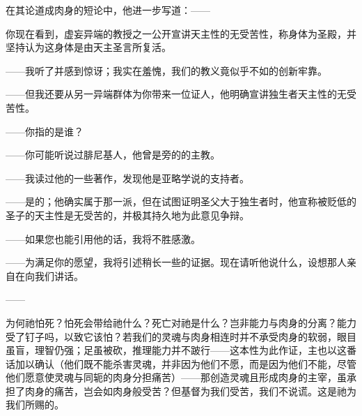 在其论道成肉身的短论中，他进一步写道：——\par

\par

你现在看到，虚妄异端的教授之一公开宣讲天主性的无受苦性，称身体为圣殿，并坚持认为这身体是由天主圣言所复活。\par

——我听了并感到惊讶；我实在羞愧，我们的教义竟似乎不如的创新牢靠。\par

——但我还要从另一异端群体为你带来一位证人，他明确宣讲独生者天主性的无受苦性。\par

——你指的是谁？\par

——你可能听说过腓尼基人，他曾是旁的的主教。\par

——我读过他的一些著作，发现他是亚略学说的支持者。\par

——是的；他确实属于那一派，但在试图证明圣父大于独生者时，他宣称被贬低的圣子的天主性是无受苦的，并极其持久地为此意见争辩。\par

——如果您也能引用他的话，我将不胜感激。\par

——为满足你的愿望，我将引述稍长一些的证据。现在请听他说什么，设想那人亲自在向我们讲话。\par

——\par

为何祂怕死？怕死会带给祂什么？死亡对祂是什么？岂非能力与肉身的分离？能力受了钉子吗，以致它该怕？若我们的灵魂与肉身相连时并不承受肉身的软弱，眼目虽盲，理智仍强；足虽被砍，推理能力并不跛行——这本性为此作证，主也以这番话加以确认（他们既不能杀害灵魂，并非因为他们不愿，而是因为他们不能，尽管他们愿意使灵魂与同轭的肉身分担痛苦）——那创造灵魂且形成肉身的主宰，虽承担了肉身的痛苦，岂会如肉身般受苦？但基督为我们受苦，我们不说谎。这是祂为我们所赐的。\par

